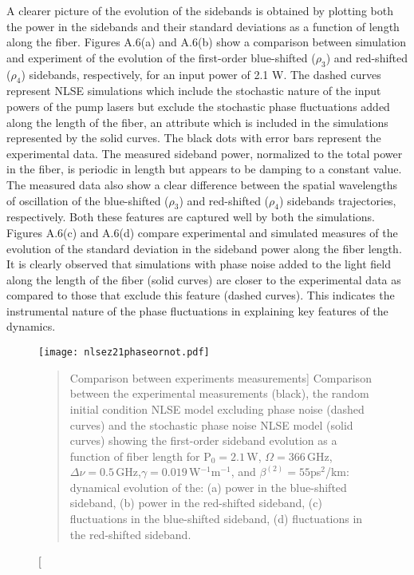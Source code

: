 A clearer picture of the evolution of the sidebands is obtained by plotting both the
power in the sidebands and their standard deviations as a function of length along the fiber. Figures A.6(a) and A.6(b) show a comparison between simulation and experiment of the evolution
of the first-order blue-shifted ($\rho_3$) and red-shifted ($\rho_4$) sidebands,
respectively, for an input power of 2.1 W. The dashed curves represent NLSE simulations
which include the stochastic nature of the input powers of the pump lasers but exclude
the stochastic phase fluctuations added along the length of the fiber, an attribute
which is included in the simulations represented by the solid curves. The black dots
with error bars represent the experimental data. The measured sideband
power, normalized to the total power in the fiber, is periodic in length but
appears to be damping to a constant value. The measured data also show a clear
difference between the spatial wavelengths of oscillation of the blue-shifted ($\rho_3$) and red-shifted ($\rho_4$) sidebands trajectories, respectively. Both these features are captured well by both the simulations. Figures A.6(c) and A.6(d) compare experimental and simulated
measures of the evolution of the standard deviation in the sideband power
along the fiber length. It is clearly observed that simulations with phase noise
added to the light field along the length of the fiber (solid curves) are closer to the
experimental data as compared to those that exclude this feature (dashed curves). This indicates
the instrumental nature of the phase fluctuations in explaining key features of the dynamics.

\begin{figure}
\begin{center}
\texttt{[image: nlsez21phaseornot.pdf]}
\end{center}
\renewcommand{\baselinestretch}{1}
\small\normalsize
\begin{quote}
\caption
[Comparison between experiments measurements]
{Comparison between the experimental measurements \cite{hart1}(black), the random initial condition NLSE model excluding phase noise (dashed curves) and the stochastic phase noise NLSE model (solid curves) showing the first-order sideband evolution as a function of fiber length for P$_{0} = 2.1$\,W, $\Omega = 366$\,GHz, $\Delta\nu = 0.5$\,GHz,$\gamma = 0.019$\,W$^{-1}$m$^{-1}$, and $\beta^{(2)} = 55$ps$^2$/km: dynamical evolution of the: (a) power in the blue-shifted sideband, (b) power in the red-shifted sideband, (c) fluctuations in the blue-shifted sideband, (d) fluctuations in the red-shifted sideband.}
\label{figA.6}
\end{quote}
\end{figure}
\renewcommand{\baselinestretch}{2}
\small\normalsize

